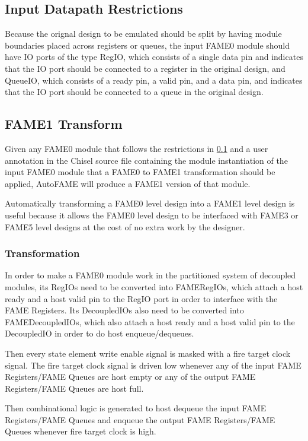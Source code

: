 \subsection{Input Datapath Restrictions}
\label{section:fameRestrictions}
Because the orignal design to be emulated should be split by having module boundaries placed across registers or queues, the input FAME0 module should have IO ports of the type RegIO, which consists of a single data pin and indicates that the IO port should be connected to a register in the original design, and QueueIO, which consists of a ready pin, a valid pin, and a data pin, and indicates that the IO port should be connected to a queue in the original design.

\subsection{FAME1 Transform}
Given any FAME0 module that follows the restrictions in \ref{section:fameRestrictions} and a user annotation in the Chisel source file containing the module instantiation of the input FAME0 module that a FAME0 to FAME1 transformation should be applied, AutoFAME will produce a FAME1 version of that module.

Automatically transforming a FAME0 level design into a FAME1 level design is useful because it allows the FAME0 level design to be interfaced with FAME3 or FAME5 level designs at the cost of no extra work by the designer.

\subsubsection{Transformation}
In order to make a FAME0 module work in the partitioned system of decoupled modules, its RegIOs need to be converted into FAMERegIOs, which attach a host ready and a host valid pin to the RegIO port in order to interface with the FAME Registers. Its DecoupledIOs also need to be converted into FAMEDecoupledIOs, which also attach a host ready and a host valid pin to the DecoupledIO in order to do host enqueue/dequeues.

Then every state element write enable signal is masked with a fire target clock signal. The fire target clock signal is driven low whenever any of the input FAME Registers/FAME Queues are host empty or any of the output FAME Registers/FAME Queues are host full.

Then combinational logic is generated to host dequeue the input FAME Registers/FAME Queues and enqueue the output FAME Registers/FAME Queues whenever fire target clock is high.


